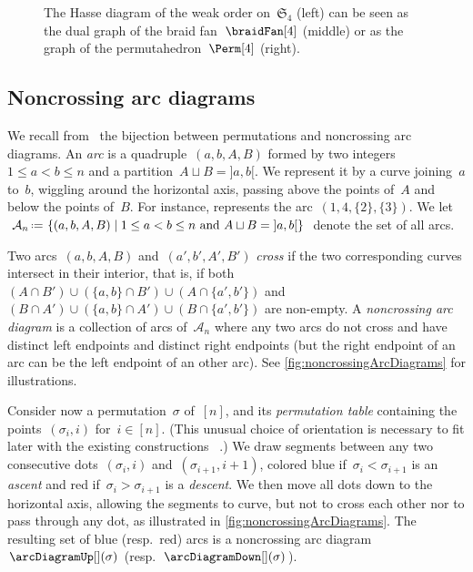 \documentclass{amsart}
\theoremstyle{definition}
\newcommand{\f}[1]{{\mathfrak{#1}}} %
\newcommand{\set}[2]{\left\{ #1 \;\middle|\; #2 \right\}} %
\newcommand{\eqdef}{\mbox{\,\raisebox{0.2ex}{\scriptsize\ensuremath{\mathrm:}}\ensuremath{=}\,}} %
\newcommand{\darkblue}{\color{darkblue}} %
\newcommand{\defn}[1]{\textsl{\darkblue #1}} %
\newcommand{\arcs}{{\mathcal{A}}} %
\begin{document}
\begin{figure}
	\caption{The Hasse diagram of the weak order on~$\f{S}_4$ (left) can be seen as the dual graph of the braid fan~$\braidFan[4]$ (middle) or as the graph of the permutahedron~$\Perm[4]$ (right). \cite[Fig.~1]{PilaudSantos-quotientopes}}
	\label{fig:weakOrder4}
\end{figure}


\subsection{Noncrossing arc diagrams}
\label{subsec:noncrossingArcDiagrams}

We recall from~\cite{Reading-arcDiagrams} the bijection between permutations and noncrossing arc diagrams.
An \defn{arc} is a quadruple~$(a, b, A, B)$ formed by two integers $1 \le a < b \le n$ and a partition~${A \sqcup B = {]a,b[}}$.
We represent it by a curve joining~$a$ to~$b$, wiggling around the horizontal axis, passing above the points of~$A$ and below the points of~$B$.
For instance,  represents the arc~$(1,4,\{2\},\{3\})$.
We let~$\arcs_n \eqdef \set{(a, b, A, B)}{1 \le a < b \le n \text{ and } A \sqcup B = {]a,b[}}$ denote the set of all arcs.

Two arcs~$(a, b, A, B)$ and~$(a', b', A', B')$ \defn{cross} if the two corresponding curves intersect in their interior, that is, if both~$(A \cap B') \cup (\{a,b\} \cap B') \cup (A \cap \{a',b'\})$ and~$(B \cap A') \cup (\{a,b\} \cap A') \cup (B \cap \{a',b'\})$ are non-empty.
A \defn{noncrossing arc diagram} is a collection of arcs of~$\arcs_n$ where any two arcs do not cross and have distinct left endpoints and distinct right endpoints (but the right endpoint of an arc can be the left endpoint of an other arc).
See \cref{fig:noncrossingArcDiagrams} for illustrations.

Consider now a permutation~$\sigma$ of~$[n]$, and its \defn{permutation table} containing the points~$(\sigma_i, i)$ for~$i \in [n]$.
(This unusual choice of orientation is necessary to fit later with the existing constructions ~\cite{LodayRonco, HivertNovelliThibon-algebraBinarySearchTrees, ChatelPilaud, PilaudPons-permutrees}.)
We draw segments between any two consecutive dots~$(\sigma_i, i)$ and~$(\sigma_{i+1}, i+1)$, colored blue if~$\sigma_i < \sigma_{i+1}$ is an \defn{ascent} and red if~$\sigma_i > \sigma_{i+1}$ is a \defn{descent}.
We then move all dots down to the horizontal axis, allowing the segments to curve, but not to cross each other nor to pass through any dot, as illustrated in \cref{fig:noncrossingArcDiagrams}.
The resulting set of blue (resp.~red) arcs is a noncrossing arc diagram~$\arcDiagramUp[](\sigma)$ (resp.~$\arcDiagramDown[](\sigma)$).
\end{document}
